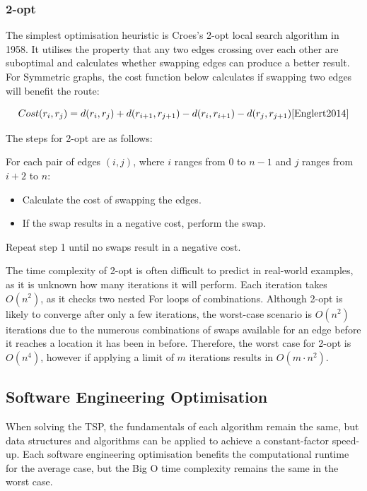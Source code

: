 \subsubsection{2-opt}

The simplest optimisation heuristic is Croes's 2-opt local search algorithm in 1958\cite{Croes1958}. It utilises the property that any two edges crossing over each other are suboptimal and calculates whether swapping edges can produce a better result. For Symmetric graphs, the cost function below calculates if swapping two edges will benefit the route:

\begin{equation}
    Cost(r_i,r_j) = d(r_i,r_j) + d(r_{i+1},r_{j+1}) -d(r_i,r_{i+1}) - d(r_j,r_{j+1})
\cite{Englert2014}
\end{equation}

The steps for 2-opt are as follows\cite{Croes1958}:

\begin{legal}
    \item For each pair of edges $(i, j)$, where $i$ ranges from $0$ to $n-1$ and $j$ ranges from $i+2$ to $n$:
    \begin{itemize}
        \item Calculate the cost of swapping the edges.
        \item If the swap results in a negative cost, perform the swap.
    \end{itemize}
    
    \item Repeat step 1 until no swaps result in a negative cost.
\end{legal}

The time complexity of 2-opt is often difficult to predict in real-world examples, as it is unknown how many iterations it will perform. Each iteration takes \(O(n^2)\)\cite{Englert2014}, as it checks two nested For loops of combinations. Although 2-opt is likely to converge after only a few iterations, the worst-case scenario is \(O(n^2)\) iterations due to the numerous combinations of swaps available for an edge before it reaches a location it has been in before. Therefore, the worst case for 2-opt is \(O(n^4)\)\cite{Englert2014}, however if applying a limit of $m$ iterations results in \(O(m\cdot n^2)\). 

\subsection{Software Engineering Optimisation}
\label{SWEOps}
When solving the TSP, the fundamentals of each algorithm remain the same, but data structures and algorithms can be applied to achieve a constant-factor speed-up. Each software engineering optimisation benefits the computational runtime for the average case, but the Big O time complexity remains the same in the worst case\cite{applegate2006traveling}. 

